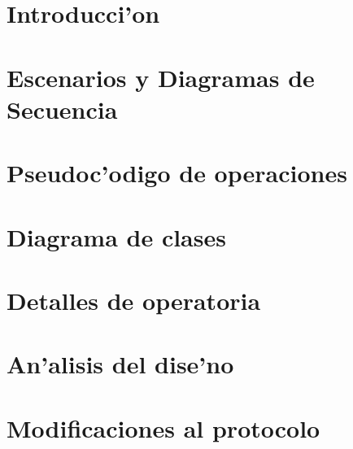 \documentclass[spanish, a4paper, 10pt, titlepage]{article}
\author{Echevarr'ia - Farjat - Freijo - Giusto}
\begin{document}

\tableofcontents
\clearpage



\section{Introducci'on}

\clearpage
 
\section{Escenarios y Diagramas de Secuencia}

\clearpage

\section{Pseudoc'odigo de operaciones}

\clearpage

\section{Diagrama de clases}

\clearpage

\section{Detalles de operatoria}

\clearpage

\section{An'alisis del dise'no}

\clearpage

\section{Modificaciones al protocolo}\label{Seccion::ModificacionesAlProtocolo}

\clearpage
\end{document}
